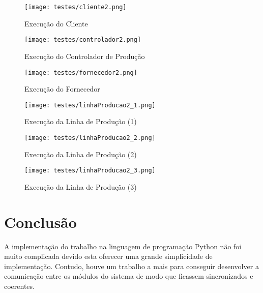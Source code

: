 \documentclass[brazil, a4paper,12pt]{article}
\begin{document}
\begin{enumerate}
\begin{figure}[h]
\centering\texttt{[image: testes/cliente2.png]}
\caption{Execuç\~ao do Cliente}
\label{fig:cliente2}
\end{figure}

\begin{figure}[h]
\centering\texttt{[image: testes/controlador2.png]}
\caption{Execuç\~ao do Controlador de Produç\~ao}
\label{fig:controlador2}
\end{figure}

\begin{figure}[h]
\centering\texttt{[image: testes/fornecedor2.png]}
\caption{Execuç\~ao do Fornecedor}
\label{fig:fornecedor2}
\end{figure}

\begin{figure}[h]
\centering\texttt{[image: testes/linhaProducao2\_1.png]}
\caption{Execuç\~ao da Linha de Produç\~ao (1)}
\label{fig:linhaproducao2}
\end{figure}

\begin{figure}[h]
\centering\texttt{[image: testes/linhaProducao2\_2.png]}
\caption{Execuç\~ao da Linha de Produç\~ao (2)}
\label{fig:linhaproducao2}
\end{figure}

\begin{figure}[h]
\centering\texttt{[image: testes/linhaProducao2\_3.png]}
\caption{Execuç\~ao da Linha de Produç\~ao (3)}
\label{fig:linhaproducao2}
\end{figure}

\vfill
\clearpage

\end{enumerate}

\newpage

\section{Conclus\~ao}
A implementação do trabalho na linguagem de programação Python não foi muito complicada devido esta oferecer uma grande simplicidade de implementação. Contudo, houve um trabalho a mais para conseguir desenvolver a comunicação entre os módulos do sistema de modo que ficassem sincronizados e coerentes.

\nocite{*}
	
  	
\end{document}
